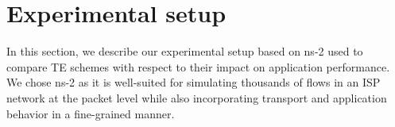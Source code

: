\section{Experimental setup}
\label{sec:exp_setup}

In this section, we describe our experimental setup based on ns-2 used to compare TE schemes with respect to their impact on application performance. 
We chose ns-2 as it is well-suited for simulating thousands of flows in an ISP network at the packet level while also incorporating transport and application behavior in a fine-grained manner.








